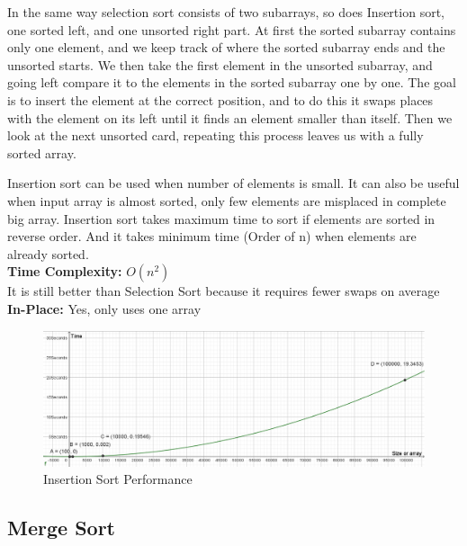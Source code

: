 \documentclass{article}
\begin{document}
In the same way selection sort consists of two subarrays, so does Insertion sort, one sorted left, and one unsorted right part. At first the sorted subarray contains only one element, and we keep track of where the sorted subarray ends and the unsorted starts. We then take the first element in the unsorted subarray, and going left compare it to the elements in the sorted subarray one by one. The goal is to insert the element at the correct position, and to do this it swaps places with the element on its left until it finds an element smaller than itself. Then we look at the next unsorted card, repeating this process leaves us with a fully sorted array.

Insertion sort can be used when number of elements is small. It can also be useful when input array is almost sorted, only few elements are misplaced in complete big array. Insertion sort takes maximum time to sort if elements are sorted in reverse order. And it takes minimum time (Order of n) when elements are already sorted.
\\
\textbf{Time Complexity:} $O(n^{2})$\\
It is still better than Selection Sort because it requires fewer swaps on average
\\
\textbf{In-Place:} Yes, only uses one array

\begin{figure}[h]
	\centering
	\includegraphics[width=1\linewidth]{"images/Insertion Sort"}
	\caption{Insertion Sort Performance}
	\label{fig:insertion-sort}
\end{figure}




\subsection{Merge Sort}
\end{document}
